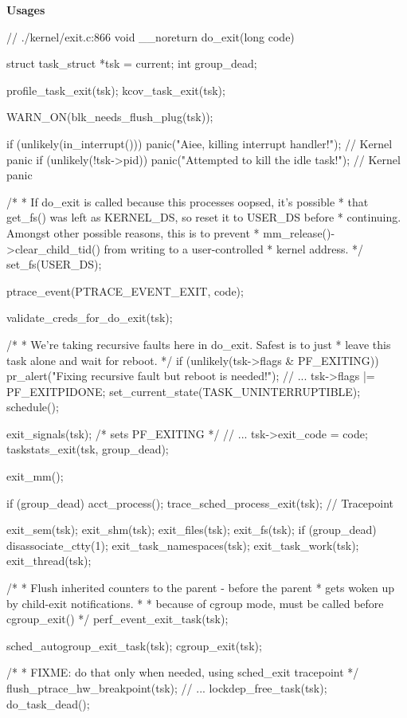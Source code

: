\textbf{Usages} 
\begin{code}
// ./kernel/exit.c:866
void __noreturn do_exit(long code){
	struct task_struct *tsk = current;
	int group_dead;

	profile_task_exit(tsk);
	kcov_task_exit(tsk);

	WARN_ON(blk_needs_flush_plug(tsk));

	if (unlikely(in_interrupt()))
		panic("Aiee, killing interrupt handler!"); // Kernel panic
	if (unlikely(!tsk->pid))
		panic("Attempted to kill the idle task!"); // Kernel panic

	/*
	 * If do_exit is called because this processes oopsed, it's possible
	 * that get_fs() was left as KERNEL_DS, so reset it to USER_DS before
	 * continuing. Amongst other possible reasons, this is to prevent
	 * mm_release()->clear_child_tid() from writing to a user-controlled
	 * kernel address.
	 */
	set_fs(USER_DS);

	ptrace_event(PTRACE_EVENT_EXIT, code);

	validate_creds_for_do_exit(tsk);

	/*
	 * We're taking recursive faults here in do_exit. Safest is to just
	 * leave this task alone and wait for reboot.
	 */
	if (unlikely(tsk->flags & PF_EXITING)) {
		pr_alert("Fixing recursive fault but reboot is needed!\n");
        // ...
		tsk->flags |= PF_EXITPIDONE;
		set_current_state(TASK_UNINTERRUPTIBLE);
		schedule();
	}

	exit_signals(tsk);  /* sets PF_EXITING */
        // ...
	tsk->exit_code = code;
	taskstats_exit(tsk, group_dead);

	exit_mm();

	if (group_dead)
		acct_process();
	trace_sched_process_exit(tsk); // Tracepoint

	exit_sem(tsk);
	exit_shm(tsk);
	exit_files(tsk);
	exit_fs(tsk);
	if (group_dead)
		disassociate_ctty(1);
	exit_task_namespaces(tsk);
	exit_task_work(tsk);
	exit_thread(tsk);

	/*
	 * Flush inherited counters to the parent - before the parent
	 * gets woken up by child-exit notifications.
	 *
	 * because of cgroup mode, must be called before cgroup_exit()
	 */
	perf_event_exit_task(tsk);

	sched_autogroup_exit_task(tsk);
	cgroup_exit(tsk);

	/*
	 * FIXME: do that only when needed, using sched_exit tracepoint
	 */
	flush_ptrace_hw_breakpoint(tsk);
        // ...
	lockdep_free_task(tsk);
	do_task_dead();
}
\end{code}
  
